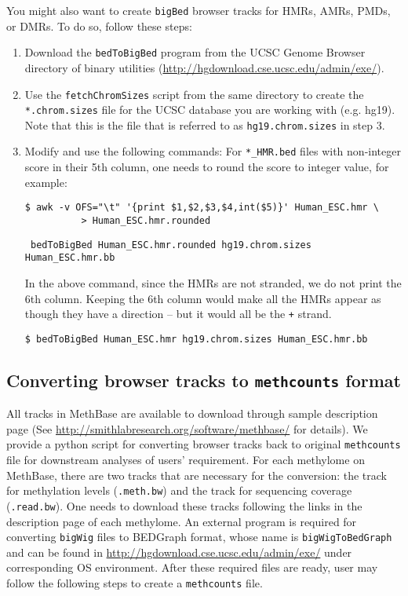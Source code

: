 \documentclass[10pt]{article}
\newcommand{\prog}[1]{\texttt{#1}}
\newcommand{\fn}[1]{\texttt{#1}}
\newcommand{\lit}[1]{\texttt{#1}}
\begin{document}
\noindent
You might also want to create \fn{bigBed} browser tracks for HMRs,
AMRs, PMDs, or DMRs. To do so, follow these steps:
\begin{enumerate}
\item Download the \prog{bedToBigBed} program from the UCSC Genome
  Browser directory of binary utilities
  (\url{http://hgdownload.cse.ucsc.edu/admin/exe/}).
\item Use the \fn{fetchChromSizes} script from the same directory to
  create the \fn{*.chrom.sizes} file for the UCSC database you are
  working with (e.g. hg19). Note that this is the file that is
  referred to as \fn{hg19.chrom.sizes} in step 3.
\item Modify and use the following commands: For \fn{*\_HMR.bed} files
  with non-integer score in their 5th column, one needs to round the
  score to integer value, for example:
\begin{verbatim}
$ awk -v OFS="\t" '{print $1,$2,$3,$4,int($5)}' Human_ESC.hmr \
          > Human_ESC.hmr.rounded
\end{verbatim}

\begin{verbatim}
 bedToBigBed Human_ESC.hmr.rounded hg19.chrom.sizes Human_ESC.hmr.bb
\end{verbatim}

  In the above command, since the HMRs are not stranded, we do not
  print the 6th column. Keeping the 6th column would make all the HMRs
  appear as though they have a direction -- but it would all be the
  \lit{+} strand.
\begin{verbatim}
$ bedToBigBed Human_ESC.hmr hg19.chrom.sizes Human_ESC.hmr.bb
\end{verbatim}
\end{enumerate}

\subsection{Converting browser tracks to \texttt{methcounts} format}
All tracks in MethBase are available to download through sample description
page (See \url{http://smithlabresearch.org/software/methbase/} for details). 
We provide a python script for converting browser tracks back to original
\texttt{methcounts} file for downstream analyses of users' requirement. For
each methylome on MethBase, there are two tracks that are necessary for
the conversion: the track for methylation levels (\texttt{.meth.bw}) and
the track for sequencing coverage (\texttt{.read.bw}). One needs to download
these tracks following the links in the description page of each methylome.
An external program is required for converting \texttt{bigWig} files to
BEDGraph format, whose name is \texttt{bigWigToBedGraph} and can be found
in \url{http://hgdownload.cse.ucsc.edu/admin/exe/} under corresponding
OS environment. After these required files are ready, user may follow the
following steps to create a \texttt{methcounts} file.
\end{document}
